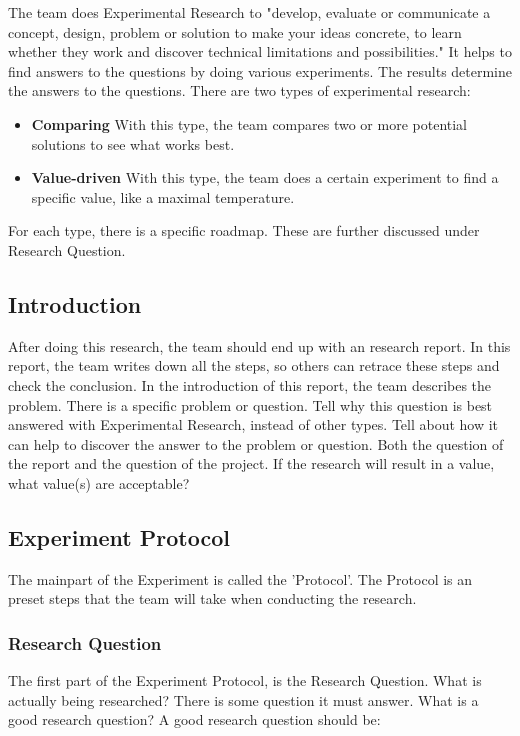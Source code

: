 \documentclass[10pt]{report}
\begin{document}
The team does Experimental Research to "develop, evaluate or communicate a concept, design, problem or solution to make your ideas concrete, to learn whether they work and discover technical limitations and possibilities." It helps to find answers to the questions by doing various experiments. The results determine the answers to the questions. There are two types of experimental research:

\begin{itemize}
	\item \textbf{Comparing} With this type, the team compares two or more potential solutions to see what works best.
	\item \textbf{Value-driven} With this type, the team does a certain experiment to find a specific value, like a maximal temperature.
\end{itemize}

For each type, there is a specific roadmap. These are further discussed under Research Question.

\subsection{Introduction}

After doing this research, the team should end up with an research report. In this report, the team writes down all the steps, so others can retrace these steps and check the conclusion. In the introduction of this report, the team describes the problem. There is a specific problem or question. Tell why this question is best answered with Experimental Research, instead of other types. Tell about how it can help to discover the answer to the problem or question. Both the question of the report and the question of the project. If the research will result in a value, what value(s) are acceptable?

\subsection{Experiment Protocol}

The mainpart of the Experiment is called the 'Protocol'. The Protocol is an preset steps that the team will take when conducting the research.

\subsubsection{Research Question}

The first part of the Experiment Protocol, is the Research Question. What is actually being researched? There is some question it must answer. What is a good research question? A good research question should be:
\end{document}
